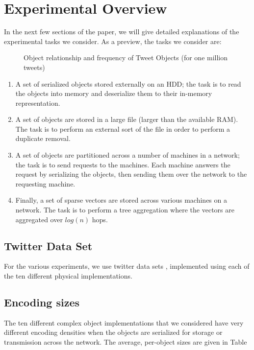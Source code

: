 \section{Experimental Overview}

In the next few sections of the paper, we will give detailed explanations of the experimental tasks we consider. As a preview, the tasks we consider are:

\begin{figure*}[t]
	\centering
	\resizebox{!}{3.5in}{
	   
	 }
	\caption{Object relationship and frequency of Tweet Objects (for one million tweets)}
	\label{fig:tweet_complex_object}
\end{figure*}

\begin{enumerate}
	\item A set of serialized objects stored externally on an HDD; the task is to read the objects into memory and deserialize them to their in-memory representation.
	\item A set of objects are stored in a large file (larger than the available RAM). The task is to perform an external sort of the file in order to perform a duplicate removal.
	\item A set of objects are partitioned across a number of machines in a network; the task is to send requests to the 	machines. Each machine answers the request by serializing the objects, then sending them over the network to the requesting machine.
	\item Finally, a set of sparse vectors are stored across various machines on a network. The task is to perform a tree aggregation where the vectors are aggregated over $log ( n )$
	hops.
\end{enumerate}

\subsection{Twitter Data Set}
For the various experiments, we use twitter data sets \cite{tweet_objects}, implemented using each of the ten different physical implementations. 

\subsection{Encoding sizes}
The ten different complex object implementations that we considered have very different encoding densities when the objects are serialized for storage or transmission across the network. The average, per-object sizes are given in Table %
		
